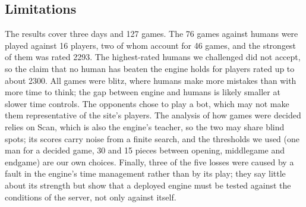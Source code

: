 \subsection{Limitations}\label{sec:disc-limits}

The results cover three days and 127 games. The 76 games against humans were
played against 16 players, two of whom account for 46 games, and the strongest
of them was rated 2293. The highest-rated humans we challenged did not accept, so the claim that no human has beaten the engine holds for players
rated up to about 2300. All games were blitz, where humans make more mistakes
than with more time to think; the gap between engine and humans is likely smaller
at slower time controls. The opponents chose to play a bot, which may not make
them representative of the site's players. The analysis of how games were
decided relies on Scan, which is also the engine's teacher, so the two may share
blind spots; its scores carry noise from a finite search, and the thresholds we
used (one man for a decided game, 30 and 15 pieces between opening, middlegame
and endgame) are our own choices. Finally, three of the five losses were caused
by a fault in the engine's time management rather than by its play; they say
little about its strength but show that a deployed engine must be tested against
the conditions of the server, not only against itself.
